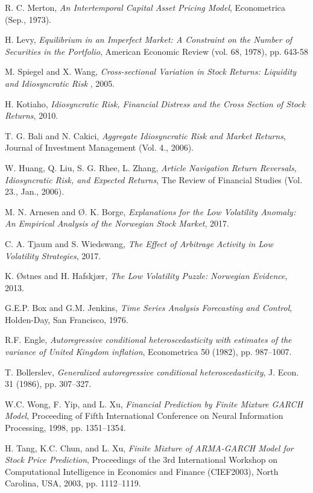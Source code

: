 \begin{thebibliography}{9}
R. C. Merton, \textit{An Intertemporal Capital Asset Pricing Model}, Econometrica (Sep., 1973).

H. Levy, \textit{Equilibrium in an Imperfect Market: A Constraint on the Number of Securities in the Portfolio}, American Economic Review (vol. 68, 1978), pp. 643-58

M. Spiegel and X. Wang, \textit{Cross-sectional Variation in Stock Returns:
Liquidity and Idiosyncratic Risk }, 2005.

H. Kotiaho, \textit{Idiosyncratic Risk, Financial Distress
and the Cross Section of Stock Returns}, 2010.


T. G. Bali and N. Cakici, \textit{Aggregate Idiosyncratic Risk and Market Returns}, Journal of Investment Management (Vol. 4., 2006).

W. Huang, Q. Liu, S. G. Rhee, L. Zhang, \textit{Article Navigation
Return Reversals, Idiosyncratic Risk, and Expected Returns}, The Review of Financial Studies (Vol. 23., Jan., 2006).

M. N. Arnesen and Ø. K. Borge, \textit{Explanations for the Low Volatility Anomaly: An Empirical Analysis of the Norwegian Stock Market}, 2017.

C. A. Tjaum and S. Wiedswang, \textit{The Effect of Arbitrage Activity in
Low Volatility Strategies}, 2017.

K. Østnes and H. Hafskjær, \textit{The Low Volatility Puzzle:
Norwegian Evidence}, 2013.


G.E.P. Box and G.M. Jenkins, \textit{Time Series Analysis Forecasting and Control}, Holden-Day, San Francisco, 1976.

R.F. Engle, \textit{Autoregressive conditional heteroscedasticity with estimates of the variance of United Kingdom inflation}, Econometrica 50 (1982), pp. 987–1007.

T. Bollerslev, \textit{Generalized autoregressive conditional heteroscedasticity}, J. Econ. 31 (1986), pp. 307–327.

W.C. Wong, F. Yip, and L. Xu, \textit{Financial Prediction by Finite Mixture GARCH Model}, Proceeding of Fifth International Conference on Neural Information Processing, 1998, pp. 1351–1354.

H. Tang, K.C. Chun, and L. Xu, \textit{Finite Mixture of ARMA-GARCH Model for Stock Price Prediction}, Proceedings of the 3rd International Workshop on Computational Intelligence in Economics and Finance (CIEF2003), North
Carolina, USA, 2003, pp. 1112–1119.


\end{thebibliography}
